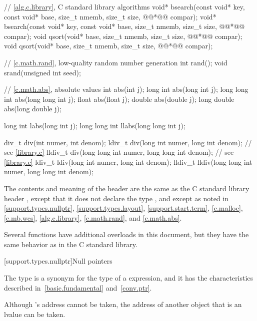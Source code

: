 \begin{codeblock}
{  // \ref{alg.c.library}, C standard library algorithms
  void* bsearch(const void* key, const void* base, size_t nmemb, size_t size,
                @@*@\itcorr[-1]@ compar);
  void* bsearch(const void* key, const void* base, size_t nmemb, size_t size,
                @@*@\itcorr[-1]@ compar);
  void qsort(void* base, size_t nmemb, size_t size, @@*@\itcorr[-1]@ compar);
  void qsort(void* base, size_t nmemb, size_t size, @@*@\itcorr[-1]@ compar);

  // \ref{c.math.rand}, low-quality random number generation
  int rand();
  void srand(unsigned int seed);

  // \ref{c.math.abs}, absolute values
  int abs(int j);
  long int abs(long int j);
  long long int abs(long long int j);
  float abs(float j);
  double abs(double j);
  long double abs(long double j);

  long int labs(long int j);
  long long int llabs(long long int j);

  div_t div(int numer, int denom);
  ldiv_t div(long int numer, long int denom);                   // see \ref{library.c}
  lldiv_t div(long long int numer, long long int denom);        // see \ref{library.c}
  ldiv_t ldiv(long int numer, long int denom);
  lldiv_t lldiv(long long int numer, long long int denom);
}
\end{codeblock}

\pnum
The contents and meaning of the header  are the same as
the C standard library header ,
except that it does not declare the type ,
and except as noted in
\ref{support.types.nullptr},
\ref{support.types.layout},
\ref{support.start.term},
\ref{c.malloc},
\ref{c.mb.wcs},
\ref{alg.c.library},
\ref{c.math.rand}, and
\ref{c.math.abs}.
\begin{note}
Several functions have additional overloads in this document,
but they have the same behavior as in the C standard library.
\end{note}


[support.types.nullptr]{Null pointers}

\pnum
{}%
The type  is a synonym
for the type of a  expression, and it
has the characteristics
described in~\ref{basic.fundamental} and~\ref{conv.ptr}.
\begin{note}
Although 's address cannot be taken, the address of another
 object that is an lvalue can be taken.
\end{note}


